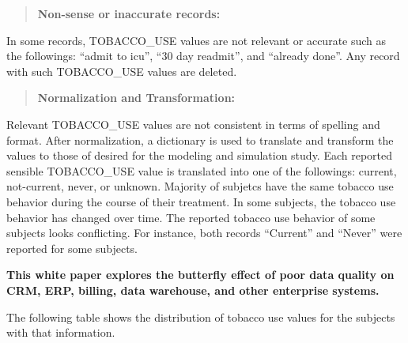 \documentclass{article}
\begin{document}
\begin{quote}
\textbf{Non-sense or inaccurate records:}
\end{quote}
In some records, TOBACCO\_USE values are not relevant or accurate such as the followings:
``admit to icu'', ``30 day readmit'', and ``already done''. Any record with such TOBACCO\_USE values are deleted.

\begin{quote}
\textbf{Normalization and Transformation:}
\end{quote}
Relevant TOBACCO\_USE values are not consistent in terms of spelling and format. After normalization, a dictionary is used to translate and transform the values to those of desired for the modeling and simulation study. Each reported sensible TOBACCO\_USE value is translated into one of the followings: current, not-current, never, or unknown. 
Majority of subjetcs have the same tobacco use behavior during the course of their treatment. In some subjects, the tobacco use behavior has changed over time. The reported tobacco use behavior of some subjects looks conflicting. For instance, both records ``Current''  and ``Never'' were reported for some subjects.

\textbf{This white paper explores the butterfly effect of poor data quality on CRM, ERP, billing, data 
warehouse, and other enterprise systems.}







The following table shows the distribution of tobacco use values for the subjects with that information. 
\end{document}
